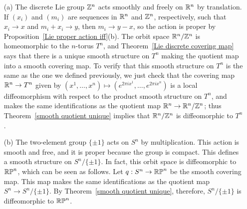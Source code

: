 \begin{example}
\mbox{}
\begin{itemize}
\item[(a)] The discrete Lie group $\mathbb{Z}^n$ acts smoothly and freely on $\mathbb{R}^n$ by translation. If $(x_i)$ and $(m_i)$ are sequences in $\mathbb{R}^n$ and $\mathbb{Z}^n$, respectively, such that $x_i\to x$ and $m_i+x_i\to y$, then $m_i\to y-x$, so the action is proper by Proposition~\ref{Lie proper action iff}(b). The orbit space $\mathbb{R}^n/\mathbb{Z}^n$ is homeomorphic to the $n$-torus $T^n$, and Theorem~\ref{Lie discrete covering map} says that there is a unique smooth structure on $T^n$ making the quotient map into a smooth covering map. To verify that this smooth structure on $T^n$ is the same as the one we defined previously, we just check that the covering map $\mathbb{R}^n\to T^n$ given by $(x^1,\dots,x^n)\mapsto(e^{2\pi ix^1},\dots,e^{2\pi ix^n})$ is a local diffeomorphism with respect to the product smooth structure on $T^n$, and makes the same identifications as the quotient map $\mathbb{R}^n\to\mathbb{R}^n/\mathbb{Z}^n$; thus Theorem~\ref{smooth quotient unique} implies that $\mathbb{R}^n/\mathbb{Z}^n$ is diffeomorphic to $T^n$.
\item[(b)] The two-element group $\{\pm 1\}$ acts on $S^n$ by multiplication. This action is smooth and free, and it is proper because the group is compact. This defines a smooth structure on $S^n/\{\pm1\}$. In fact, this orbit space is diffeomorphic to $\mathbb{RP}^n$, which can be seen as follows. Let $q:S^n\to\mathbb{RP}^n$ be the smooth covering map. This map makes the same identifications as the quotient map $S^n\to S^n/\{\pm1\}$. By Theorem~\ref{smooth quotient unique}, therefore, $S^n/\{\pm1\}$ is diffeomorphic to $\mathbb{RP}^n$.
\end{itemize}
\end{example}
